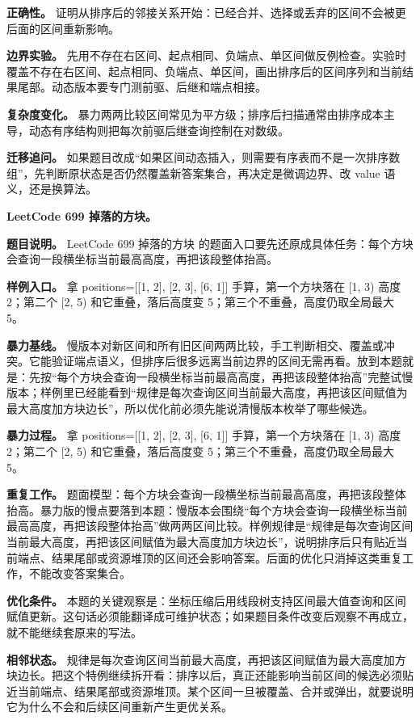 \textbf{正确性。} 证明从排序后的邻接关系开始：已经合并、选择或丢弃的区间不会被更后面的区间重新影响。

\textbf{边界实验。} 先用不存在右区间、起点相同、负端点、单区间做反例检查。实验时覆盖不存在右区间、起点相同、负端点、单区间，画出排序后的区间序列和当前结果尾部。动态版本要专门测前驱、后继和端点相接。

\textbf{复杂度变化。} 暴力两两比较区间常见为平方级；排序后扫描通常由排序成本主导，动态有序结构则把每次前驱后继查询控制在对数级。

\textbf{迁移追问。} 如果题目改成“如果区间动态插入，则需要有序表而不是一次排序数组”，先判断原状态是否仍然覆盖新答案集合，再决定是微调边界、改 value 语义，还是换算法。

\noindent\textbf{LeetCode 699 掉落的方块。}

\textbf{题目说明。} LeetCode 699 掉落的方块 的题面入口要先还原成具体任务：每个方块会查询一段横坐标当前最高高度，再把该段整体抬高。

\textbf{样例入口。} 拿 positions=[[1, 2], [2, 3], [6, 1]] 手算，第一个方块落在 [1, 3) 高度 2；第二个 [2, 5) 和它重叠，落后高度变 5；第三个不重叠，高度仍取全局最大 5。

\textbf{暴力基线。} 慢版本对新区间和所有旧区间两两比较，手工判断相交、覆盖或冲突。它能验证端点语义，但排序后很多远离当前边界的区间无需再看。放到本题就是：先按“每个方块会查询一段横坐标当前最高高度，再把该段整体抬高”完整试慢版本；样例里已经能看到“规律是每次查询区间当前最大高度，再把该区间赋值为最大高度加方块边长”，所以优化前必须先能说清慢版本枚举了哪些候选。

\textbf{暴力过程。} 拿 positions=[[1, 2], [2, 3], [6, 1]] 手算，第一个方块落在 [1, 3) 高度 2；第二个 [2, 5) 和它重叠，落后高度变 5；第三个不重叠，高度仍取全局最大 5。

\textbf{重复工作。} 题面模型：每个方块会查询一段横坐标当前最高高度，再把该段整体抬高。暴力版的慢点要落到本题：慢版本会围绕“每个方块会查询一段横坐标当前最高高度，再把该段整体抬高”做两两区间比较。样例规律是“规律是每次查询区间当前最大高度，再把该区间赋值为最大高度加方块边长”，说明排序后只有贴近当前端点、结果尾部或资源堆顶的区间还会影响答案。后面的优化只消掉这类重复工作，不能改变答案集合。

\textbf{优化条件。} 本题的关键观察是：坐标压缩后用线段树支持区间最大值查询和区间赋值更新。这句话必须能翻译成可维护状态；如果题目条件改变后观察不再成立，就不能继续套原来的写法。

\textbf{相邻状态。} 规律是每次查询区间当前最大高度，再把该区间赋值为最大高度加方块边长。把这个特例继续拆开看：排序以后，真正还能影响当前区间的候选必须贴近当前端点、结果尾部或资源堆顶。某个区间一旦被覆盖、合并或弹出，就要说明它为什么不会和后续区间重新产生更优关系。

